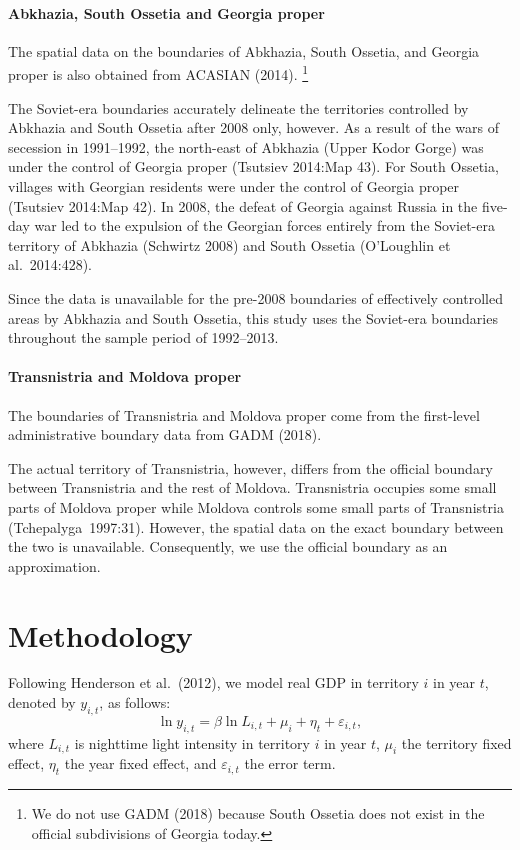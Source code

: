 \documentclass[12pt,a4paper]{article}%
\begin{document}
\paragraph{Abkhazia, South Ossetia and Georgia proper}  
The spatial data on the boundaries of Abkhazia, South Ossetia, and Georgia proper is also obtained from ACASIAN (2014).%
\footnote{
	We do not use GADM (2018) because South Ossetia does not exist in the official subdivisions of Georgia today.
	} 


The Soviet-era boundaries accurately delineate the territories controlled by Abkhazia and South Ossetia after 2008 only, however. As a result of the wars of secession in 1991--1992, the north-east of Abkhazia (Upper Kodor Gorge) was under the control of Georgia proper (Tsutsiev 2014:Map 43). 
For South Ossetia, villages with Georgian residents were under the control of Georgia proper (Tsutsiev 2014:Map 42). 
In 2008, the defeat of Georgia against Russia in the five-day war led to the expulsion of the Georgian forces entirely from the Soviet-era territory of Abkhazia (Schwirtz 2008) and South Ossetia (O'Loughlin et al.\ 2014:428).  

Since the data is unavailable for the pre-2008 boundaries of effectively controlled areas by Abkhazia and South Ossetia, this study uses the Soviet-era boundaries throughout the sample period of 1992--2013.

\paragraph{Transnistria and Moldova proper} 
The boundaries of Transnistria and Moldova proper come from the first-level administrative boundary data from GADM (2018). 

The actual territory of Transnistria, however, differs from the official boundary between Transnistria and the rest of Moldova. 
Transnistria occupies some small parts of Moldova proper while Moldova controls some small parts of Transnistria (Tchepalyga\ 1997:31). 
However, the spatial data on the exact boundary between the two is unavailable. 
Consequently, we use the official boundary as an approximation.

\section{Methodology}\label{methodology}
Following Henderson et al.\ (2012), we model real GDP in territory $i$ in year $t$, denoted by $y_{i,t}$, as follows:
\begin{equation}\label{gdp}
\ln y_{i,t} = \beta \ln L_{i,t} + \mu_i + \eta_t + \varepsilon_{i,t},
\end{equation}
where $L_{i,t}$ is nighttime light intensity in territory $i$ in year $t$, $\mu_i$ the territory fixed effect, $\eta_t$ the year fixed effect, and $\varepsilon_{i,t}$ the error term.
\end{document}

